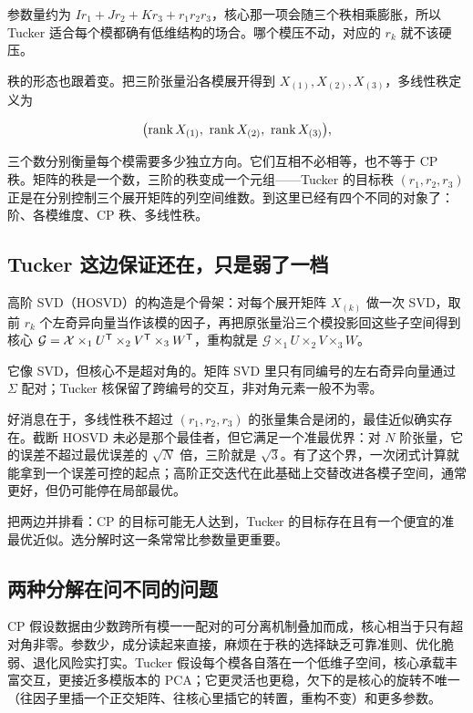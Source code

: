 参数量约为 \(Ir_1+Jr_2+Kr_3+r_1r_2r_3\)，核心那一项会随三个秩相乘膨胀，所以 Tucker 适合每个模都确有低维结构的场合。哪个模压不动，对应的 \(r_k\) 就不该硬压。

秩的形态也跟着变。把三阶张量沿各模展开得到 \(X_{(1)},X_{(2)},X_{(3)}\)，多线性秩定义为

\[
\bigl(\rank X_{(1)},\ \rank X_{(2)},\ \rank X_{(3)}\bigr),
\]

三个数分别衡量每个模需要多少独立方向。它们互相不必相等，也不等于 CP 秩。矩阵的秩是一个数，三阶的秩变成一个元组——Tucker 的目标秩 \((r_1,r_2,r_3)\) 正是在分别控制三个展开矩阵的列空间维数。到这里已经有四个不同的对象了：阶、各模维度、CP 秩、多线性秩。

\subsection{Tucker 这边保证还在，只是弱了一档}

高阶 SVD（HOSVD）的构造是个骨架：对每个展开矩阵 \(X_{(k)}\) 做一次 SVD，取前 \(r_k\) 个左奇异向量当作该模的因子，再把原张量沿三个模投影回这些子空间得到核心 \(\mathcal G=\mathcal X\times_1U^{\mathsf{T}}\times_2V^{\mathsf{T}}\times_3W^{\mathsf{T}}\)，重构就是 \(\mathcal G\times_1U\times_2V\times_3W\)。

它像 SVD，但核心不是超对角的。矩阵 SVD 里只有同编号的左右奇异向量通过 \(\Sigma\) 配对；Tucker 核保留了跨编号的交互，非对角元素一般不为零。

好消息在于，多线性秩不超过 \((r_1,r_2,r_3)\) 的张量集合是闭的，最佳近似确实存在。截断 HOSVD 未必是那个最佳者，但它满足一个准最优界：对 \(N\) 阶张量，它的误差不超过最优误差的 \(\sqrt{N}\) 倍，三阶就是 \(\sqrt{3}\)。有了这个界，一次闭式计算就能拿到一个误差可控的起点；高阶正交迭代在此基础上交替改进各模子空间，通常更好，但仍可能停在局部最优。

把两边并排看：CP 的目标可能无人达到，Tucker 的目标存在且有一个便宜的准最优近似。选分解时这一条常常比参数量更重要。

\subsection{两种分解在问不同的问题}

CP 假设数据由少数跨所有模一一配对的可分离机制叠加而成，核心相当于只有超对角非零。参数少，成分读起来直接，麻烦在于秩的选择缺乏可靠准则、优化脆弱、退化风险实打实。Tucker 假设每个模各自落在一个低维子空间，核心承载丰富交互，更接近多模版本的 PCA；它更灵活也更稳，欠下的是核心的旋转不唯一（往因子里插一个正交矩阵、往核心里插它的转置，重构不变）和更多参数。


